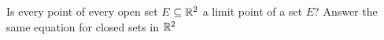 Is every point of every open set $E \subseteq \mathbb{R}^2$ a limit point of a set $E$? Answer the same equation for closed sets in $\mathbb{R}^2$

\begin{tcolorbox}
	\begin{solution}
		
	\end{solution}
\end{tcolorbox}